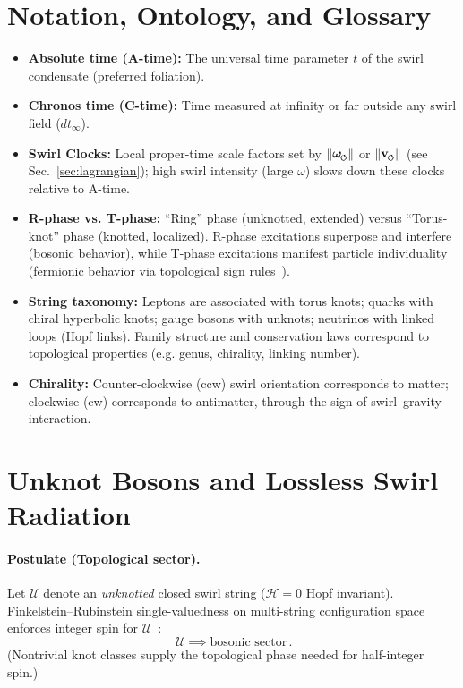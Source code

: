 \documentclass[11pt]{article}
\begin{document}
\section{Notation, Ontology, and Glossary}
\label{sec:glossary}
\begin{itemize}
\item \textbf{Absolute time (A-time):} The universal time parameter $t$ of the swirl condensate (preferred foliation).
\item \textbf{Chronos time (C-time):} Time measured at infinity or far outside any swirl field ($dt_\infty$).
\item \textbf{Swirl Clocks:} Local proper-time scale factors set by $\|\omegas\|$ or $\|\vswirl\|$ (see Sec.~\ref{sec:lagrangian}); high swirl intensity (large $\omega$) slows down these clocks relative to A-time.
\item \textbf{R-phase vs. T-phase:} ``Ring'' phase (unknotted, extended) versus ``Torus-knot'' phase (knotted, localized). R-phase excitations superpose and interfere (bosonic behavior), while T-phase excitations manifest particle individuality (fermionic behavior via topological sign rules~\cite{FinkelsteinRubinstein1968}).
\item \textbf{String taxonomy:} Leptons are associated with torus knots; quarks with chiral hyperbolic knots; gauge bosons with unknots; neutrinos with linked loops (Hopf links). Family structure and conservation laws correspond to topological properties (e.g. genus, chirality, linking number).
\item \textbf{Chirality:} Counter-clockwise (ccw) swirl orientation corresponds to matter; clockwise (cw) corresponds to antimatter, through the sign of swirl–gravity interaction.
\end{itemize}

\section{Unknot Bosons and Lossless Swirl Radiation}
\label{sec:bosons_photons}
\paragraph{Postulate (Topological sector).}
    Let $\mathcal{U}$ denote an \emph{unknotted} closed swirl string ($\mathcal{H}=0$ Hopf invariant). Finkelstein–Rubinstein single-valuedness on multi-string configuration space enforces integer spin for $\mathcal{U}$~\cite{FinkelsteinRubinstein1968}:
    \[
        \boxed{\,\mathcal{U} \implies \text{bosonic sector}\,.}
    \]
    (Nontrivial knot classes supply the topological phase needed for half-integer spin.)
\end{document}

